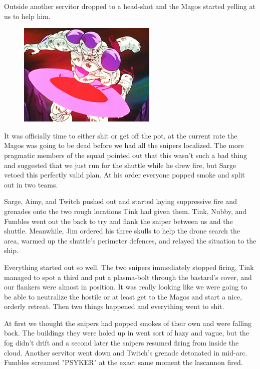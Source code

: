 Outside another servitor dropped to a head-shot and the Magos started yelling at us to help him.

\begin{figure}
	\begin{center}
		\includegraphics[width=\figwidth]{pics/11/23.png}
	\end{center}
\end{figure}
It was officially time to either shit or get off the pot, at the current rate the Magos was going to be dead before we had all the snipers localized. 
The more pragmatic members of the squad pointed out that this wasn't such a bad thing and suggested that we just run for the shuttle while he drew fire, but Sarge vetoed this perfectly valid plan. 
At his order everyone popped smoke and split out in two teams. 


Sarge, Aimy, and Twitch pushed out and started laying suppressive fire and grenades onto the two rough locations Tink had given them. 
Tink, Nubby, and Fumbles went out the back to try and flank the sniper between us and the shuttle. 
Meanwhile, Jim ordered his three skulls to help the drone search the area, warmed up the shuttle's perimeter defences, and relayed the situation to the ship.

Everything started out so well. 
The two snipers immediately stopped firing, Tink managed to spot a third and put a plasma-bolt through the bastard's cover, and our flankers were almost in position. 
It was really looking like we were going to be able to neutralize the hostile or at least get to the Magos and start a nice, orderly retreat. 
Then two things happened and everything went to shit.

At first we thought the snipers had popped smokes of their own and were falling back. 
The buildings they were holed up in went sort of hazy and vague, but the fog didn't drift and a second later the snipers resumed firing from inside the cloud. 
Another servitor went down and Twitch's grenade detonated in mid-arc. 
Fumbles screamed "PSYKER" at the exact same moment the lascannon fired.


